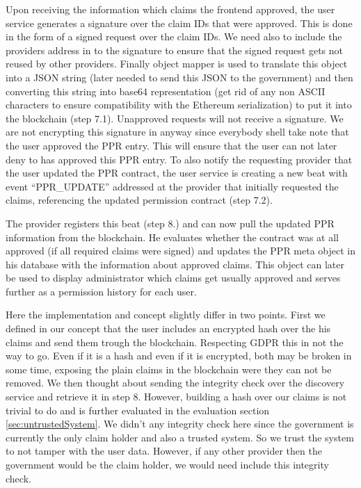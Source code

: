 Upon receiving the information which claims the frontend approved, the user service generates a signature over the claim IDs that were approved. This is done in the form of a signed request over the claim IDs. We need also to include the providers address in to the signature to ensure that the signed request gets not reused by other providers. Finally object mapper is used to translate this object into a JSON string (later needed to send this JSON to the government) and then converting this string into base64 representation (get rid of any non ASCII characters to ensure compatibility with the Ethereum serialization) to put it into the blockchain (step 7.1). Unapproved requests will not receive a signature. We are not encrypting this signature in anyway since everybody shell take note that the user approved the PPR entry. This will ensure that the user can not later deny to has approved this PPR entry. To also notify the requesting provider that the user updated the PPR contract, the user service is creating a new beat with event “PPR\_UPDATE” addressed at the provider that initially requested the claims, referencing the updated permission contract (step 7.2).

The provider registers this beat (step 8.) and can now pull the updated PPR information from the blockchain. He evaluates whether the contract was at all approved (if all required claims were signed) and updates the PPR meta object in his database with the information about approved claims. This object can later be used to display administrator which claims get usually approved and serves further as a permission history for each user. 

Here the implementation and concept slightly differ in two points. First we defined in our concept that the user includes an encrypted hash over the his claims and send them trough the blockchain. Respecting GDPR this in not the way to go. Even if it is a hash and even if it is encrypted, both may be broken in some time, exposing the plain claims in the blockchain were they can not be removed. We then thought about sending the integrity check over the discovery service and retrieve it in step 8. However, building a hash over our claims is not trivial to do and is further evaluated in the evaluation section \ref{sec:untrustedSystem}. We didn’t any integrity check here since the government is currently the only claim holder and also a trusted system. So we trust the system to not tamper with the user data. However, if any other provider then the government would be the claim holder, we would need include this integrity check. 

